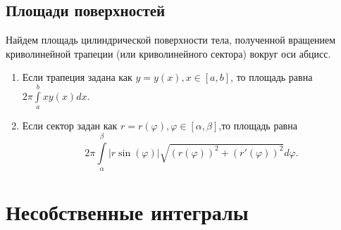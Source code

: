 \documentclass[a4paper,12pt]{scrartcl}
\begin{document}
\subsection{Площади поверхностей}

Найдем площадь цилиндрической поверхности тела, полученной вращением криволинейной трапеции (или криволинейного сектора) вокруг оси абцисс.

\begin{enumerate}
\item Если трапеция задана как $y = y(x), x\in [a,b]$, то площадь равна $2\pi\int\limits_{a}^{b}xy(x)dx.$
\item Если сектор задан как $r =r(\varphi), \varphi \in[\alpha, \beta]$,то площадь равна $$2\pi\int\limits_{\alpha}^{\beta}|r\sin(\varphi)|\sqrt{(r(\varphi))^2 + (r'(\varphi))^2}d\varphi.$$
\end{enumerate}

\section{Несобственные интегралы}
\end{document}
